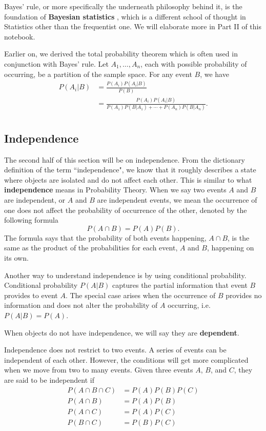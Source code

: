 \documentclass[11pt, a4paper, oneside]{book}
\theoremstyle{definition}
\begin{document}
\noindent Bayes' rule, or more specifically the underneath philosophy behind it, is the foundation of \textbf{Bayesian statistics} , which is a different school of thought in Statistics other than the frequentist one. We will elaborate more in Part II of this notebook. 

\noindent Earlier on, we derived the total probability theorem which is often used in conjunction with Bayes' rule. Let $A_1, \dots, A_n$, each with possible probability of occurring, be a partition of the sample space. For any event $B$, we have
\begin{equation*}
\begin{split}
P(A_i | B) &= \frac{P(A_i)P(A_i | B)}{P(B)} \\
&= \frac{P(A_i)P(A_i | B)}{P(A_1)P(B|A_1) + \cdots + P(A_n)P(B|A_n)}. \\
\end{split}
\end{equation*}

\subsection{Independence}

\noindent The second half of this section will be on independence. From the dictionary definition of the term ``independence", we know that it roughly describes a state where objects are isolated and do not affect each other. This is similar to what \textbf{independence} means in Probability Theory. When we say two events $A$ and $B$ are independent, or $A$ and $B$ are independent events, we mean the occurrence of one does not affect the probability of occurrence of the other, denoted by the following formula \[
P(A \cap B) = P(A)P(B).
\]
The formula says that the probability of both events happening, $A \cap B$, is the same as the product of the probabilities for each event, $A$ and $B$, happening on its own.

\noindent Another way to understand independence is by using conditional probability. Conditional probability $P(A|B)$ captures the partial information that event $B$ provides to event $A$. The special case arises when the occurrence of $B$ provides no information and does not alter the probability of $A$ occurring, i.e. $P(A|B) = P(A)$. 

\noindent When objects do not have independence, we will say they are \textbf{dependent}.

\noindent Independence does not restrict to two events. A series of events can be independent of each other. However, the conditions will get more complicated when we move from two to many events. Given three events $A$, $B$, and $C$, they are said to be independent if
\begin{equation*}
\begin{split}
P(A \cap B \cap C) &= P(A) P(B) P(C) \\
P(A \cap B) &= P(A) P(B) \\
P(A \cap C) &= P(A) P(C) \\
P(B \cap C) &= P(B) P(C) \\
\end{split}
\end{equation*}
\end{document}
